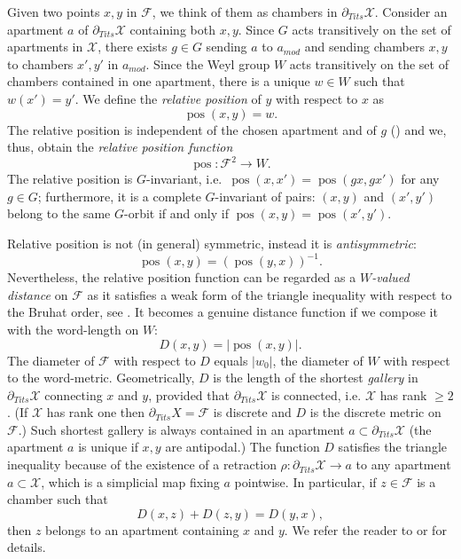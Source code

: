 \documentclass[12pt]{amsbook}%
\theoremstyle{definition}
\theoremstyle{remark}
\numberwithin{section}{chapter}
\numberwithin{subsection}{section}
\numberwithin{figure}{chapter}
\DeclareMathOperator{\pos}{pos}
\def\tits{\partial_{Tits}}
\def\amod{a_{mod}}
\def\cF{{\mathscr{F}}}
\def\cX{{\mathscr{X}}}
\begin{document}
{{Given two points $x, y$ in $\cF$, we think of them as chambers in $\tits \cX$. Consider an apartment $a$ of $\tits \cX$ containing both $x, y$. Since $G$ acts transitively on the set of apartments in $\cX$, there exists $g\in G$ sending $a$ to $\amod$ and sending chambers $x, y$ to 
chambers $x', y'$ in $\amod$. Since the Weyl group $W$ acts transitively on the set of chambers contained in one apartment, there is a unique $w\in W$ such that $w(x')=y'$. 
We define the {\em relative position} of $y$ with respect to $x$ as \index{$\pos(x,y)$, the relative position}
\[\operatorname{pos}(x,y)=w.\]
The relative position is independent of the chosen apartment and of $g$ (\cite{KLP18}) and we, thus, obtain 
the {\em relative position function} 
$$
\operatorname{pos} : \cF^2\to W. 
$$
The relative position is $G$-invariant, i.e.\ $\operatorname{pos}(x,x')=\operatorname{pos}(gx,gx')$ for any $g\in G$; furthermore, it is a complete $G$-invariant 
of pairs: $(x, y)$ and $(x', y')$ belong to the same $G$-orbit if and only if $\operatorname{pos}(x,y)=\operatorname{pos}(x',y')$. 


Relative position is not (in general) symmetric, instead it is {\em antisymmetric}: 
$$
\operatorname{pos}(x,y)= \left(\operatorname{pos}(y,x)\right)^{-1}. 
$$
Nevertheless, the relative position function can be regarded as a {\em $W$-valued distance} on $\cF$ as it satisfies a weak form of the triangle inequality with respect to the Bruhat order, see \cite{Ronan}.  It becomes a genuine distance function if we compose it with the word-length on $W$:
$$
D(x,y)= |\operatorname{pos}(x,y)|.  
$$
The diameter of $\cF$ with respect to $D$ equals $|w_0|$, the diameter of $W$ with respect to the word-metric.  Geometrically, $D$ is the length of the shortest {\em gallery} in $\tits \cX$ connecting $x$ and $y$, provided that $\tits \cX$ is connected, i.e. $\cX$ has rank $\geqslant 2$. (If $\cX$ has rank one then $\tits X=\cF$ is discrete and $D$ is the discrete metric on $\cF$.) Such shortest gallery is always contained in an apartment $a\subset \tits \cX$ (the apartment $a$ is unique if $x, y$ are antipodal.) The function $D$ satisfies the triangle inequality because of the existence of a retraction $\rho: \tits \cX\to a$ to any apartment $a\subset \cX$, which is a simplicial map fixing $a$ pointwise. In particular, if $z\in \cF$ is a chamber such that 
$$
D(x,z)+ D(z,y)= D(y,x),
$$
then $z$ belongs to an apartment containing $x$ and $y$. We refer the reader to \cite[Chapter IV]{Brown} or \cite[Chapter 3]{Ronan} for details.  




}}
\end{document}
